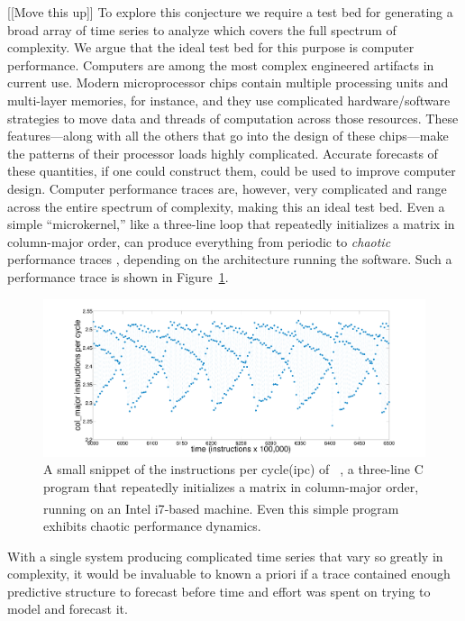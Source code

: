 [[Move this up]]
To explore this conjecture we require a test bed for generating a broad array of time series to analyze which covers the full spectrum of complexity. We argue that the ideal test bed for this purpose is computer performance. Computers are among the most complex engineered artifacts in current
use.  Modern microprocessor chips contain multiple processing units
and multi-layer memories, for instance, and they use complicated
hardware/software strategies to move data and threads of computation
across those resources.  These features---along with all the others
that go into the design of these chips---make the patterns of their
processor loads highly complicated. Accurate forecasts of these quantities, if one could
construct them, could be used to improve computer design. 
 Computer performance traces are, however, very
complicated and range across the entire spectrum of complexity, making this an ideal test bed.  Even a simple ``microkernel,'' like a three-line loop that
repeatedly initializes a matrix in column-major order, can produce everything from periodic to
{\sl chaotic} performance traces \cite{mytkowicz09}, depending on the architecture running the software. Such a performance trace is shown in
Figure~\ref{fig:ipc}.%
%
 \begin{figure}[htbp]
    \centering
    \includegraphics[width=\textwidth]{figs/colshortts}
    \caption{A small snippet of the instructions per cycle(ipc) of {\tt
        \col}, a three-line C program that repeatedly initializes
      a matrix in column-major order, running on an Intel i7\textsuperscript{\textregistered}-based machine.  Even this
      simple program exhibits chaotic performance dynamics.}
   \label{fig:ipc}
  \end{figure}
With a single system producing complicated time series that vary so greatly in complexity, it would be invaluable to known a priori if a trace contained enough predictive structure to forecast before time and effort was spent on trying to model and forecast it. 

